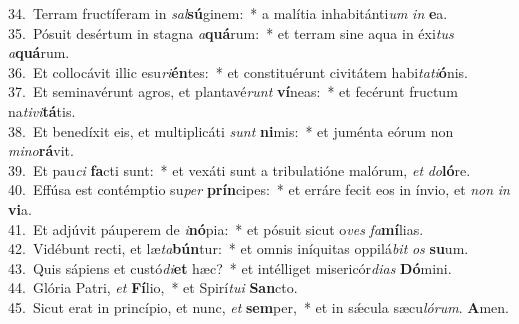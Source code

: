 {34.~}Terram fructíferam in \textit{sal}\textbf{sú}ginem:~* a malítia inhabitánti\textit{um} \textit{in} \textbf{e}a.\\
{35.~}Pósuit desértum in stagna \textit{a}\textbf{quá}rum:~* et terram sine aqua in éxi\textit{tus} \textit{a}\textbf{quá}rum.\\
{36.~}Et collocávit illic esu\textit{ri}\textbf{én}tes:~* et constituérunt civitátem habi\textit{ta}\textit{ti}\textbf{ó}nis.\\
{37.~}Et seminavérunt agros, et plantavé\textit{runt} \textbf{ví}neas:~* et fecérunt fructum na\textit{ti}\textit{vi}\textbf{tá}tis.\\
{38.~}Et benedíxit eis, et multiplicáti \textit{sunt} \textbf{ni}mis:~* et juménta eórum non \textit{mi}\textit{no}\textbf{rá}vit.\\
{39.~}Et pau\textit{ci} \textbf{fa}cti sunt:~* et vexáti sunt a tribulatióne malórum, \textit{et} \textit{do}\textbf{ló}re.\\
{40.~}Effúsa est contémptio su\textit{per} \textbf{prín}cipes:~* et erráre fecit eos in ínvio, et \textit{non} \textit{in} \textbf{vi}a.\\
{41.~}Et adjúvit páuperem de \textit{i}\textbf{nó}pia:~* et pósuit sicut o\textit{ves} \textit{fa}\textbf{mí}lias.\\
{42.~}Vidébunt recti, et læ\textit{ta}\textbf{bún}tur:~* et omnis iníquitas oppilá\textit{bit} \textit{os} \textbf{su}um.\\
{43.~}Quis sápiens et custó\textit{di}\textbf{et} hæc?~* et intélliget misericór\textit{di}\textit{as} \textbf{Dó}mini.\\
{44.~}Glória Patri, \textit{et} \textbf{Fí}lio,~* et Spirí\textit{tu}\textit{i} \textbf{San}cto.\\
{45.~}Sicut erat in princípio, et nunc, \textit{et} \textbf{sem}per,~* et in sǽcula sæcu\textit{ló}\textit{rum}. \textbf{A}men.\\
